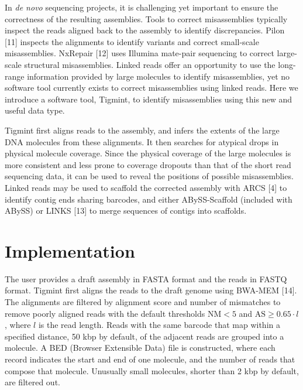 \documentclass{bmcart}
\begin{document}
In \emph{de novo} sequencing projects, it is challenging yet important to ensure the correctness of the resulting assemblies. Tools to correct misassemblies typically inspect the reads aligned back to the assembly to identify discrepancies. Pilon {[}11{]} inspects the alignments to identify variants and correct small-scale misassemblies. NxRepair {[}12{]} uses Illumina mate-pair sequencing to correct large-scale structural misassemblies. Linked reads offer an opportunity to use the long-range information provided by large molecules to identify misassemblies, yet no software tool currently exists to correct misassemblies using linked reads. Here we introduce a software tool, Tigmint, to identify misassemblies using this new and useful data type.

Tigmint first aligns reads to the assembly, and infers the extents of the large DNA molecules from these alignments. It then searches for atypical drops in physical molecule coverage. Since the physical coverage of the large molecules is more consistent and less prone to coverage dropouts than that of the short read sequencing data, it can be used to reveal the positions of possible misassemblies. Linked reads may be used to scaffold the corrected assembly with ARCS {[}4{]} to identify contig ends sharing barcodes, and either ABySS-Scaffold (included with ABySS) or LINKS {[}13{]} to merge sequences of contigs into scaffolds.

\hypertarget{implementation}{%
\section*{Implementation}\label{implementation}}

The user provides a draft assembly in FASTA format and the reads in FASTQ format. Tigmint first aligns the reads to the draft genome using BWA-MEM {[}14{]}. The alignments are filtered by alignment score and number of mismatches to remove poorly aligned reads with the default thresholds \(\textrm{NM} < 5\) and \(\textrm{AS} \geq 0.65 \cdot l\), where \(l\) is the read length. Reads with the same barcode that map within a specified distance, 50 kbp by default, of the adjacent reads are grouped into a molecule. A BED (Browser Extensible Data) file is constructed, where each record indicates the start and end of one molecule, and the number of reads that compose that molecule. Unusually small molecules, shorter than 2 kbp by default, are filtered out.
\end{document}
